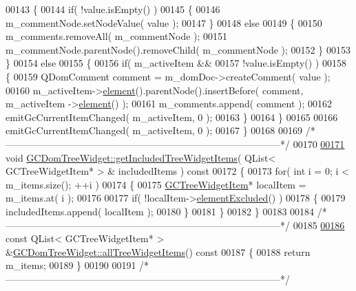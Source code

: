 \begin{DoxyCode}
00143   \{
00144     \textcolor{keywordflow}{if}( !value.isEmpty() )
00145     \{
00146       m\_commentNode.setNodeValue( value );
00147     \}
00148     \textcolor{keywordflow}{else}
00149     \{
00150       m\_comments.removeAll( m\_commentNode );
00151       m\_commentNode.parentNode().removeChild( m\_commentNode );
00152     \}
00153   \}
00154   \textcolor{keywordflow}{else}
00155   \{
00156     \textcolor{keywordflow}{if}( m\_activeItem &&
00157         !value.isEmpty() )
00158     \{
00159       QDomComment comment = m\_domDoc->createComment( value );
00160       m\_activeItem->\hyperlink{class_g_c_tree_widget_item_a584cad866bdbd94710d31eb77b804d84}{element}().parentNode().insertBefore( comment, m\_activeItem
      ->\hyperlink{class_g_c_tree_widget_item_a584cad866bdbd94710d31eb77b804d84}{element}() );
00161       m\_comments.append( comment );
00162       emitGcCurrentItemChanged( m\_activeItem, 0 );
00163     \}
00164   \}
00165 
00166   emitGcCurrentItemChanged( m\_activeItem, 0 );
00167 \}
00168 
00169 \textcolor{comment}{/*
      --------------------------------------------------------------------------------------*/}
00170 
\hypertarget{gcdomtreewidget_8cpp_source_l00171}{}\hyperlink{class_g_c_dom_tree_widget_ad26a2880721b62182091ead365799d57}{00171} \textcolor{keywordtype}{void} \hyperlink{class_g_c_dom_tree_widget_ad26a2880721b62182091ead365799d57}{GCDomTreeWidget::getIncludedTreeWidgetItems}( QList< GCTreeWidgetItem* > &
      includedItems )\textcolor{keyword}{ const}
00172 \textcolor{keyword}{}\{
00173   \textcolor{keywordflow}{for}( \textcolor{keywordtype}{int} i = 0; i < m\_items.size(); ++i )
00174   \{
00175     \hyperlink{class_g_c_tree_widget_item}{GCTreeWidgetItem}* localItem = m\_items.at( i );
00176 
00177     \textcolor{keywordflow}{if}( !localItem->\hyperlink{class_g_c_tree_widget_item_a9ea36ae7110324b227abea2036063b96}{elementExcluded}() )
00178     \{
00179       includedItems.append( localItem );
00180     \}
00181   \}
00182 \}
00183 
00184 \textcolor{comment}{/*
      --------------------------------------------------------------------------------------*/}
00185 
\hypertarget{gcdomtreewidget_8cpp_source_l00186}{}\hyperlink{class_g_c_dom_tree_widget_a913ceee0af8eefd3ec41115b64008b55}{00186} \textcolor{keyword}{const} QList< GCTreeWidgetItem* > &\hyperlink{class_g_c_dom_tree_widget_a913ceee0af8eefd3ec41115b64008b55}{GCDomTreeWidget::allTreeWidgetItems}()\textcolor{keyword}{ const}
00187 \textcolor{keyword}{}\{
00188   \textcolor{keywordflow}{return} m\_items;
00189 \}
00190 
00191 \textcolor{comment}{/*
      --------------------------------------------------------------------------------------*/}

\end{DoxyCode}

